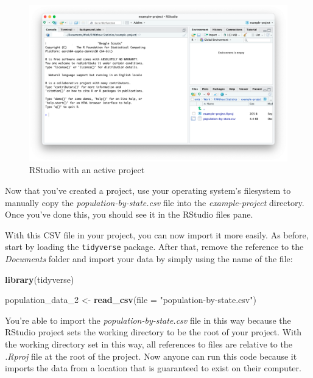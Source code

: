 \documentclass[
]{book}
\newenvironment{Shaded}{\begin{snugshade}}{\end{snugshade}}
\newcommand{\AttributeTok}[1]{\textcolor[rgb]{0.13,0.29,0.53}{#1}}
\newcommand{\FunctionTok}[1]{\textcolor[rgb]{0.13,0.29,0.53}{\textbf{#1}}}
\newcommand{\NormalTok}[1]{#1}
\newcommand{\OtherTok}[1]{\textcolor[rgb]{0.56,0.35,0.01}{#1}}
\newcommand{\StringTok}[1]{\textcolor[rgb]{0.31,0.60,0.02}{#1}}
\begin{document}
\begin{figure}
\includegraphics[width=1\linewidth]{assets/rstudio-active-project} \caption{RStudio with an active project}\label{fig:rstudio-active-project}
\end{figure}

Now that you've created a project, use your operating system's filesystem to manually copy the \emph{population-by-state.csv} file into the \emph{example-project} directory. Once you've done this, you should see it in the RStudio files pane.

With this CSV file in your project, you can now import it more easily. As before, start by loading the \texttt{tidyverse} package. After that, remove the reference to the \emph{Documents} folder and import your data by simply using the name of the file:

\begin{Shaded}
\begin{Highlighting}[]
\FunctionTok{library}\NormalTok{(tidyverse)}

\NormalTok{population\_data\_2 }\OtherTok{\textless{}{-}} \FunctionTok{read\_csv}\NormalTok{(}\AttributeTok{file =} \StringTok{"population{-}by{-}state.csv"}\NormalTok{)}
\end{Highlighting}
\end{Shaded}

You're able to import the \emph{population-by-state.csv} file in this way because the RStudio project sets the working directory to be the root of your project. With the working directory set in this way, all references to files are relative to the \emph{.Rproj} file at the root of the project. Now anyone can run this code because it imports the data from a location that is guaranteed to exist on their computer.
\end{document}
